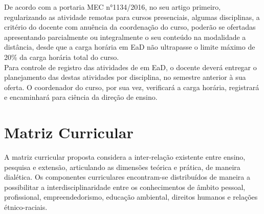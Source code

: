 De acordo com a portaria MEC n°1134/2016, no seu artigo primeiro,  regularizando as atividade remotas para cursos presenciais, algumas disciplinas, a critério do docente com anuência da coordenação do curso, poderão se ofertadas apresentando parcialmente ou integralmente o seu conteúdo na modalidade a distância, desde que a carga horária em EaD não ultrapasse o limite máximo de 20\% da carga horária total do curso.\\

Para controle de registro das atividades de em EaD, o docente deverá entregar o planejamento das destas atividades por disciplina, no semestre anterior à sua oferta. O coordenador do curso, por sua vez, verificará a carga horária, registrará e encaminhará para ciência da direção de ensino.\\

\section{Matriz Curricular}

A matriz curricular proposta considera a inter-relação existente entre ensino, pesquisa e extensão, articulando as dimensões teórica e prática, de maneira dialética. Os componentes curriculares encontram-se distribuídos de maneira a possibilitar a interdisciplinaridade entre os conhecimentos de âmbito pessoal, profissional, empreendedorismo, educação ambiental, direitos humanos e relações étnico-raciais.

\begin{quadro}[!h]	
\centering
{}		
\end{quadro}

